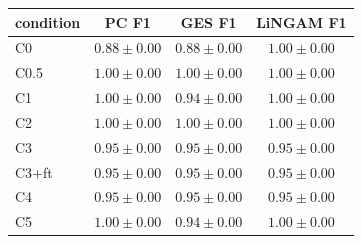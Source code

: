 \begin{tabular}{l|ccc}
\hline
condition & PC F1 & GES F1 & LiNGAM F1 \\
\hline
C0 & $0.88 \pm 0.00$ & $0.88 \pm 0.00$ & $1.00 \pm 0.00$ \\
C0.5 & $1.00 \pm 0.00$ & $1.00 \pm 0.00$ & $1.00 \pm 0.00$ \\
C1 & $1.00 \pm 0.00$ & $0.94 \pm 0.00$ & $1.00 \pm 0.00$ \\
C2 & $1.00 \pm 0.00$ & $1.00 \pm 0.00$ & $1.00 \pm 0.00$ \\
C3 & $0.95 \pm 0.00$ & $0.95 \pm 0.00$ & $0.95 \pm 0.00$ \\
C3+ft & $0.95 \pm 0.00$ & $0.95 \pm 0.00$ & $0.95 \pm 0.00$ \\
C4 & $0.95 \pm 0.00$ & $0.95 \pm 0.00$ & $0.95 \pm 0.00$ \\
C5 & $1.00 \pm 0.00$ & $0.94 \pm 0.00$ & $1.00 \pm 0.00$ \\
\hline
\end{tabular}

